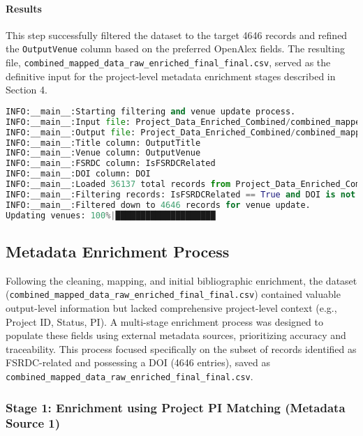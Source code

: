 \documentclass[12pt]{article}
\begin{document}
\paragraph{Results}\label{results-1}

This step successfully filtered the dataset to the target 4646 records
and refined the \texttt{OutputVenue} column based on the preferred
OpenAlex fields. The resulting file,
\texttt{combined\_mapped\_data\_raw\_enriched\_final\_final.csv}, served
as the definitive input for the project-level metadata enrichment stages
described in Section 4.

\begin{lstlisting}[language=Python]
INFO:__main__:Starting filtering and venue update process.
INFO:__main__:Input file: Project_Data_Enriched_Combined/combined_mapped_data_raw_enriched_final.csv
INFO:__main__:Output file: Project_Data_Enriched_Combined/combined_mapped_data_raw_enriched_final_final.csv
INFO:__main__:Title column: OutputTitle
INFO:__main__:Venue column: OutputVenue
INFO:__main__:FSRDC column: IsFSRDCRelated
INFO:__main__:DOI column: DOI
INFO:__main__:Loaded 36137 total records from Project_Data_Enriched_Combined/combined_mapped_data_raw_enriched_final.csv
INFO:__main__:Filtering records: IsFSRDCRelated == True and DOI is not null...
INFO:__main__:Filtered down to 4646 records for venue update.
Updating venues: 100%|████████████████████
\end{lstlisting}

\subsection{Metadata Enrichment
Process}\label{metadata-enrichment-process}

Following the cleaning, mapping, and initial bibliographic enrichment,
the dataset
(\texttt{combined\_mapped\_data\_raw\_enriched\_final\_final.csv})
contained valuable output-level information but lacked comprehensive
project-level context (e.g., Project ID, Status, PI). A multi-stage
enrichment process was designed to populate these fields using external
metadata sources, prioritizing accuracy and traceability. This process
focused specifically on the subset of records identified as
FSRDC-related and possessing a DOI (4646 entries), saved as
\texttt{combined\_mapped\_data\_raw\_enriched\_final\_final.csv}.

\subsubsection{Stage 1: Enrichment using Project PI Matching (Metadata
Source
1)}\label{stage-1-enrichment-using-project-pi-matching-metadata-source-1}
\end{document}
